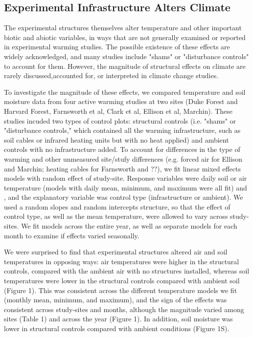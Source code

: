 \documentclass{article}
\begin{document}
\subsection {Experimental Infrastructure Alters Climate}
The experimental structures themselves alter temperature and other important biotic and abiotic variables, in ways that are not generally examined or reported in experimental warming studies. The possible existence of these effects are widely acknowledged, and many studies include "shams" or "disturbance controls" to account for them. However, the magnitude of structural effects on climate are rarely discussed,accounted for, or interpreted in climate change studies.
\par To investigate the magnitude of these effects, we compared temperature and soil moisture data from four active warming studies at two sites (Duke Forest and Harvard Forest, Farnsworth et al, Clark et al, Ellison et al, Marchin). These studies incuded two types of control plots: structural controls (i.e. "shams" or "disturbance controls," which contained all the warming infrastructure, such as soil cables or infrared heating units but with no heat applied) and ambient controls with no infrastructure added.  To account for differences in the type of warming and other unmeasured site/stufy differences (e.g. forced air for Ellison and Marchin; heating cables for Farnsworth and ??), we fit linear mixed effects models with random effect of study-site. Response variables were daily soil or air temperature (models with daily  mean, minimum, and maximum were all fit) and , and the explanatory variable was control type (infrastructure or ambient). We used a random slopes and random intercepts structure, so that the effect of control type, as well as the mean temperature, were allowed to vary across study-sites. We fit models across the entire year, as well as separate models for each month to examine if effects varied seasonally.
\par We were surprised to find that experimental structures altered air and soil temperatures in opposing ways:  air temperatures were higher in the structural controls, compared with the ambient air with no structures installed, whereas soil temperatures were lower in the structural controls compared with ambient soil (Figure 1). This was consistent across the different temperature models we fit (monthly mean, minimum, and maximum), and the sign of the effects was consistent across study-sites and months, although the magnitude varied among sites (Table 1) and across the year (Figure 1). In addition, soil moisture was lower in structural controls compared with ambient conditions (Figure 1S). 
\end{document}

